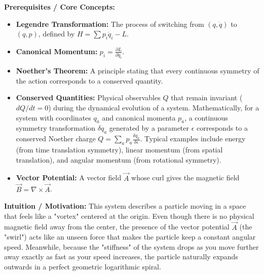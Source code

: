 \begin{solution}
\textbf{Prerequisites / Core Concepts:}
\begin{itemize}
    \item \textbf{Legendre Transformation:} The process of switching from $(q, \dot{q})$ to $(q, p)$, defined by $H = \sum p_i \dot{q}_i - L$.
    \item \textbf{Canonical Momentum:} $p_i = \frac{\partial L}{\partial \dot{q}_i}$.
    \item \textbf{Noether's Theorem:} A principle stating that every continuous symmetry of the action corresponds to a conserved quantity.
    \item \textbf{Conserved Quantities:} Physical observables $Q$ that remain invariant ($dQ/dt = 0$) during the dynamical evolution of a system. Mathematically, for a system with coordinates $q_a$ and canonical momenta $p_a$, a continuous symmetry transformation $\delta q_a$ generated by a parameter $\epsilon$ corresponds to a conserved Noether charge $Q = \sum_a p_a \frac{\delta q_a}{\delta \epsilon}$. Typical examples include energy (from time translation symmetry), linear momentum (from spatial translation), and angular momentum (from rotational symmetry).
    \item \textbf{Vector Potential:} A vector field $\vec{A}$ whose curl gives the magnetic field $\vec{B} = \nabla \times \vec{A}$.
\end{itemize}

\textbf{Intuition / Motivation:}
This system describes a particle moving in a space that feels like a "vortex" centered at the origin. Even though there is no physical magnetic field away from the center, the presence of the vector potential $\vec{A}$ (the "swirl") acts like an unseen force that makes the particle keep a constant angular speed. Meanwhile, because the "stiffness" of the system drops as you move further away exactly as fast as your speed increases, the particle naturally expands outwards in a perfect geometric logarithmic spiral.


\end{solution}
